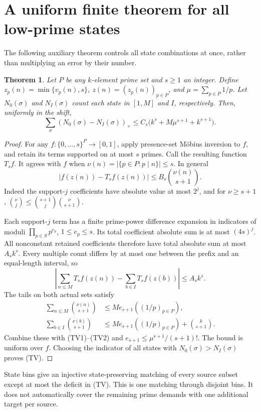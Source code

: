 \documentclass[11pt,a4paper]{article}
\newtheorem{theorem}{Theorem}[section]
\newcommand{\pos}[1]{(#1)_+}
\begin{document}
\section{A uniform finite theorem for all low-prime states}
The following auxiliary theorem controls all state combinations at
once, rather than multiplying an error by their number.
\begin{theorem}\label{thm:tv}
Let \(P\) be any \(k\)-element prime set and \(s\ge1\) an integer.
Define \(z_p(n)=\min\{v_p(n),s\}\), \(z(n)=(z_p(n))_{p\in P}\),
and \(\mu=\sum_{p\in P}1/p\).
Let \(N_0(\sigma)\) and \(N_I(\sigma)\) count each state in
\([1,M]\) and \(I\), respectively. Then, uniformly in the shift,
\[
 \sum_\sigma\pos{N_0(\sigma)-N_I(\sigma)}
 \le C_s\bigl(k^s+M\mu^{s+1}+k^{s+1}\bigr).
 \tag{TV}
\]
\end{theorem}
\begin{proof}
For any \(f:\{0,\ldots,s\}^P\to[0,1]\), apply presence-set
M\"obius inversion to \(f\), and retain its terms supported on at
most \(s\) primes. Call the resulting function \(T_sf\).
It agrees with \(f\) when \(\nu(n)=|\{p\in P:p\mid n\}|\le s\).
In general
\[
 |f(z(n))-T_sf(z(n))|
 \le B_s\binom{\nu(n)}{s+1}.
 \tag{TV1}
\]
Indeed the support-\(j\) coefficients have absolute value at most
\(2^j\), and for \(\nu\ge s+1\),
\(\binom{\nu}{j}\le\binom{s+1}{j}\binom{\nu}{s+1}\).

Each support-\(j\) term has a finite prime-power difference expansion
in indicators of moduli \(\prod_{p\in S}p^{e_p}\), \(1\le e_p\le s\).
Its total coefficient absolute sum is at most \((4s)^j\).
All nonconstant retained coefficients therefore have total absolute
sum at most \(A_sk^s\). Every multiple count differs by at most one
between the prefix and an equal-length interval, so
\[
 \left|\sum_{n\le M}T_sf(z(n))-\sum_{b\in I}T_sf(z(b))\right|
 \le A_sk^s.
 \tag{TV2}
\]
The tails on both actual sets satisfy
\begin{align*}
 \sum_{n\le M}\binom{\nu(n)}{s+1}
   &\le M e_{s+1}((1/p)_{p\in P}),\\
 \sum_{b\in I}\binom{\nu(b)}{s+1}
   &\le M e_{s+1}((1/p)_{p\in P})+\binom{k}{s+1}.
\end{align*}
Combine these with (TV1)--(TV2) and
\(e_{s+1}\le\mu^{s+1}/(s+1)!\).
The bound is uniform over \(f\). Choosing the indicator of all
states with \(N_0(\sigma)>N_I(\sigma)\) proves (TV).
\end{proof}

State bins give an injective state-preserving matching of every
source subset except at most the deficit in (TV). This is one
matching through disjoint bins. It does not automatically cover
the remaining prime demands with one additional target per source.
\end{document}
